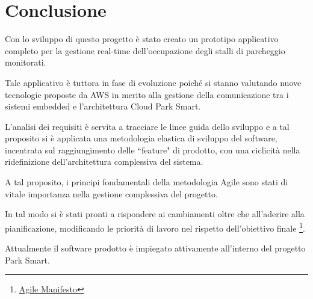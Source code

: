 \chapter{Conclusione}


Con lo sviluppo di questo progetto è stato creato un prototipo applicativo completo per la gestione real-time dell'occupazione degli stalli di parcheggio monitorati. 
\newline

Tale applicativo è tuttora in fase di evoluzione poiché si stanno valutando nuove tecnologie proposte da AWS in merito alla gestione della comunicazione tra i sistemi embedded e l'architettura Cloud Park Smart. 
\newline

L'analisi dei requisiti è servita a tracciare le linee guida dello sviluppo e a tal proposito si è applicata una metodologia elastica di sviluppo del software, incentrata sul raggiungimento delle ``feature" di prodotto, con una ciclicità nella ridefinizione dell'architettura complessiva del sistema.
\newline

A tal proposito, i principi fondamentali della metodologia Agile sono stati di vitale importanza nella gestione complessiva del progetto.
\newline

In tal modo si è stati pronti a rispondere ai cambiamenti oltre che all'aderire alla pianificazione, modificando le priorità di lavoro nel rispetto dell'obiettivo finale \footnote{\href{http://www.agilemanifesto.org}{Agile Manifesto}}. 
\newline

Attualmente il software prodotto è impiegato attivamente all'interno del progetto Park Smart.	